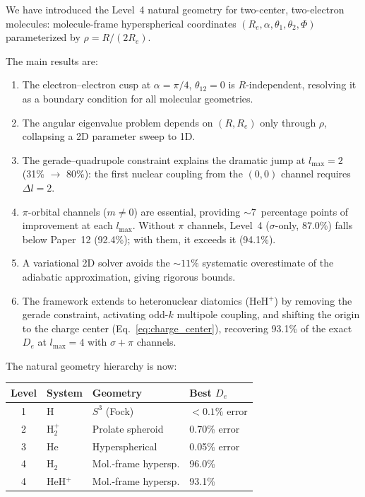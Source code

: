\documentclass[aps,pra,twocolumn,superscriptaddress,longbibliography]{revtex4-2}
\begin{document}
We have introduced the Level~4 natural geometry for two-center,
two-electron molecules: molecule-frame hyperspherical coordinates
$(R_e,\alpha,\theta_1,\theta_2,\Phi)$ parameterized by
$\rho = R/(2R_e)$.

The main results are:
\begin{enumerate}
  \item The electron--electron cusp at $\alpha = \pi/4$,
    $\theta_{12} = 0$ is $R$-independent, resolving it as a boundary
    condition for all molecular geometries.
  \item The angular eigenvalue problem depends on $(R,R_e)$ only through
    $\rho$, collapsing a 2D parameter sweep to 1D.
  \item The gerade--quadrupole constraint explains the dramatic jump at
    $l_{\max}=2$ (31\% $\to$ 80\%): the first nuclear coupling from
    the $(0,0)$ channel requires $\Delta l = 2$.
  \item $\pi$-orbital channels ($m \ne 0$) are essential, providing
    ${\sim}7$~percentage points of improvement at each $l_{\max}$.
    Without $\pi$ channels, Level~4 ($\sigma$-only, 87.0\%) falls
    below Paper~12 (92.4\%); with them, it exceeds it (94.1\%).
  \item A variational 2D solver avoids the ${\sim}11\%$ systematic
    overestimate of the adiabatic approximation, giving rigorous
    bounds.
  \item The framework extends to heteronuclear diatomics (HeH$^+$)
    by removing the gerade constraint, activating odd-$k$ multipole
    coupling, and shifting the origin to the charge center
    (Eq.~\ref{eq:charge_center}), recovering 93.1\% of the exact
    $D_e$ at $l_{\max} = 4$ with $\sigma{+}\pi$ channels.
\end{enumerate}

The natural geometry hierarchy is now:
\begin{center}
\begin{tabular}{clll}
\toprule
Level & System & Geometry & Best $D_e$ \\
\midrule
1 & H       & $S^3$ (Fock)        & $<0.1\%$ error \\
2 & H$_2^+$ & Prolate spheroid    & 0.70\% error \\
3 & He      & Hyperspherical      & 0.05\% error \\
4 & H$_2$   & Mol.-frame hypersp. & 96.0\% \\
4 & HeH$^+$ & Mol.-frame hypersp. & 93.1\% \\
\bottomrule
\end{tabular}
\end{center}
\end{document}
